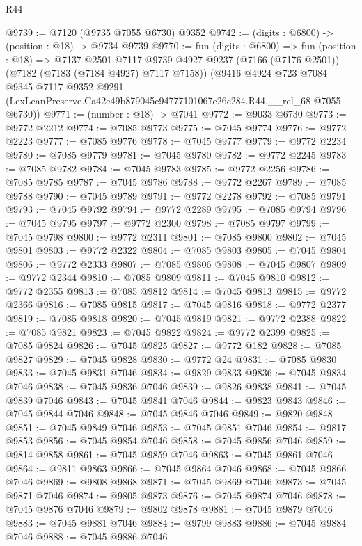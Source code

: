 \begin{lexlean}{R44}
\begin{coremodule}
{@9739 := @7120 (@9735 @7055 @6730) @9352
@9742 := (digits : @6800) -> (position : @18) -> @9734 @9739
@9770 := fun (digits : @6800) =>
  fun (position : @18) =>
  @7137
    @2501
    @7117
    @9739
    @4927
    @9237
    (@7166 (@7176 @2501))
    (@7182 (@7183 (@7184 @4927) @7117 @7158))
    (@9416
      @4924
      @723
      @7084
      @9345
      @7117
      @9352
      @9291
      (LexLeanPreserve.Ca42e49b879045c94777101067e26c284.R44.__rel_68 @7055 @6730))
@9771 := (number : @18) -> @7041
@9772 := @9033 @6730
@9773 := @9772 @2212
@9774 := @7085 @9773
@9775 := @7045 @9774
@9776 := @9772 @2223
@9777 := @7085 @9776
@9778 := @7045 @9777
@9779 := @9772 @2234
@9780 := @7085 @9779
@9781 := @7045 @9780
@9782 := @9772 @2245
@9783 := @7085 @9782
@9784 := @7045 @9783
@9785 := @9772 @2256
@9786 := @7085 @9785
@9787 := @7045 @9786
@9788 := @9772 @2267
@9789 := @7085 @9788
@9790 := @7045 @9789
@9791 := @9772 @2278
@9792 := @7085 @9791
@9793 := @7045 @9792
@9794 := @9772 @2289
@9795 := @7085 @9794
@9796 := @7045 @9795
@9797 := @9772 @2300
@9798 := @7085 @9797
@9799 := @7045 @9798
@9800 := @9772 @2311
@9801 := @7085 @9800
@9802 := @7045 @9801
@9803 := @9772 @2322
@9804 := @7085 @9803
@9805 := @7045 @9804
@9806 := @9772 @2333
@9807 := @7085 @9806
@9808 := @7045 @9807
@9809 := @9772 @2344
@9810 := @7085 @9809
@9811 := @7045 @9810
@9812 := @9772 @2355
@9813 := @7085 @9812
@9814 := @7045 @9813
@9815 := @9772 @2366
@9816 := @7085 @9815
@9817 := @7045 @9816
@9818 := @9772 @2377
@9819 := @7085 @9818
@9820 := @7045 @9819
@9821 := @9772 @2388
@9822 := @7085 @9821
@9823 := @7045 @9822
@9824 := @9772 @2399
@9825 := @7085 @9824
@9826 := @7045 @9825
@9827 := @9772 @182
@9828 := @7085 @9827
@9829 := @7045 @9828
@9830 := @9772 @24
@9831 := @7085 @9830
@9833 := @7045 @9831 @7046
@9834 := @9829 @9833
@9836 := @7045 @9834 @7046
@9838 := @7045 @9836 @7046
@9839 := @9826 @9838
@9841 := @7045 @9839 @7046
@9843 := @7045 @9841 @7046
@9844 := @9823 @9843
@9846 := @7045 @9844 @7046
@9848 := @7045 @9846 @7046
@9849 := @9820 @9848
@9851 := @7045 @9849 @7046
@9853 := @7045 @9851 @7046
@9854 := @9817 @9853
@9856 := @7045 @9854 @7046
@9858 := @7045 @9856 @7046
@9859 := @9814 @9858
@9861 := @7045 @9859 @7046
@9863 := @7045 @9861 @7046
@9864 := @9811 @9863
@9866 := @7045 @9864 @7046
@9868 := @7045 @9866 @7046
@9869 := @9808 @9868
@9871 := @7045 @9869 @7046
@9873 := @7045 @9871 @7046
@9874 := @9805 @9873
@9876 := @7045 @9874 @7046
@9878 := @7045 @9876 @7046
@9879 := @9802 @9878
@9881 := @7045 @9879 @7046
@9883 := @7045 @9881 @7046
@9884 := @9799 @9883
@9886 := @7045 @9884 @7046
@9888 := @7045 @9886 @7046
}
\end{coremodule}
\end{lexlean}
